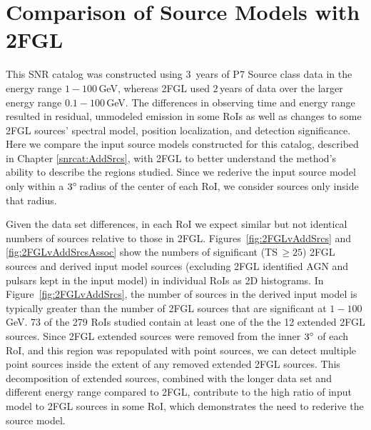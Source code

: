 
\section{Comparison of Source Models with 2FGL}
\label{snrcat:addSrcs2FGL}
This SNR catalog was constructed using $3$~years of P7 Source class data in the energy range $1-100$\,GeV, whereas 2FGL used $2$\,years of data over the larger energy range $0.1-100$\,GeV. The differences in observing time and energy range resulted in residual, unmodeled emission in some RoIs as well as changes to some 2FGL sources' spectral model, position localization, and detection significance. Here we compare the input source models constructed for this catalog, described in Chapter \ref{snrcat:AddSrcs}, with 2FGL to better understand the \srcs{} method's ability to describe the regions studied. Since we rederive the input source model only within a $3\mbox{$^\circ$}$\,radius of the center of each RoI, we consider sources only inside that radius.

Given the data set differences, in each RoI we expect similar but not identical numbers of sources relative to those in 2FGL.
Figures~\ref{fig:2FGLvAddSrcs} and \ref{fig:2FGLvAddSrcsAssoc} show the numbers of significant (TS\,$\geq 25$) 2FGL sources and derived input model sources (excluding 2FGL identified AGN and pulsars kept in the input model) in individual RoIs as 2D histograms. In Figure~\ref{fig:2FGLvAddSrcs}, the number of sources in the derived input model is typically greater than the number of 2FGL sources that are significant at $1-100$\,GeV. 73 of the 279 RoIs studied contain at least one of the the 12 extended 2FGL sources. Since 2FGL extended sources were removed from the inner $3\mbox{$^\circ$}$ of each RoI, and this region was repopulated with point sources, we can detect multiple point sources inside the extent of any removed extended 2FGL sources. This decomposition of extended sources, combined with the longer data set and different energy range compared to 2FGL, contribute to the high ratio of input model to 2FGL sources in some RoI, which demonstrates the need to rederive the source model. 

